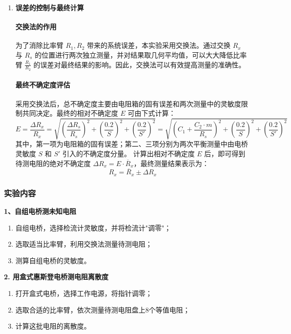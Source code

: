 \documentclass[]{../../templates/Report}%
\begin{document}
\begin{enumerate}[label=(\arabic*)]
\newpage
\item \textbf{误差的控制与最终计算}

    \paragraph{交换法的作用}
    为了消除比率臂 $R_1, R_2$ 带来的系统误差，本实验采用交换法。通过交换 $R_x$ 与 $R_s$ 的位置进行两次独立测量，并对结果取几何平均值，可以大大降低比率臂 $\frac{R_1}{R_2}$ 的误差对最终结果的影响。因此，交换法可以有效提高测量的准确性。

    \paragraph{最终不确定度评估}
    采用交换法后，总不确定度主要由电阻箱的固有误差和两次测量中的灵敏度限制共同决定。最终的相对不确定度 $E$ 可由下式计算：
    \begin{equation}
    E = \frac{\Delta R_x}{R_x} = \sqrt{\left(\frac{\Delta R_s}{R_s}\right)^2 + \left(\frac{0.2}{S}\right)^2 + \left(\frac{0.2}{S'}\right)^2}=\sqrt{\left(C_1 + \frac{C_2 \cdot m}{R_s}\right)^2 + \left(\frac{0.2}{S}\right)^2 + \left(\frac{0.2}{S'}\right)^2}
    \end{equation}
    其中，第一项为电阻箱的固有误差；第二、三项分别为两次平衡测量中由电桥灵敏度 $S$ 和 $S'$ 引入的不确定度分量。
    计算出相对不确定度 $E$ 后，即可得到待测电阻的绝对不确定度 $\Delta R_x = E \cdot \overline{R}_x$，最终测量结果表示为：
    \begin{equation}
    \boxed{R_x = \overline{R}_x \pm \Delta R_x}
    \end{equation}

\end{enumerate}

\subsubsection{实验内容}
\textbf{1、自组电桥测未知电阻}

\begin{enumerate}[label=\textbf{Step}\arabic*,leftmargin=6em]    
    \item 自组电桥，选择检流计灵敏度，并将检流计"调零"；
    \item 选取适当比率臂，利用交换法测量待测电阻；
    \item 测算自组电桥的灵敏度。
\end{enumerate}

\textbf{2. 用盒式惠斯登电桥测电阻离散度}
\begin{enumerate}[label=\textbf{Step}\arabic*,leftmargin=6em]
    \item 打开盒式电桥，选择工作电源，将指针调零；
    \item 选取合适的比率臂，依次测量待测电阻盘上8个等值电阻；
    \item 计算这批电阻的离散度。
\end{enumerate}
\end{document}
